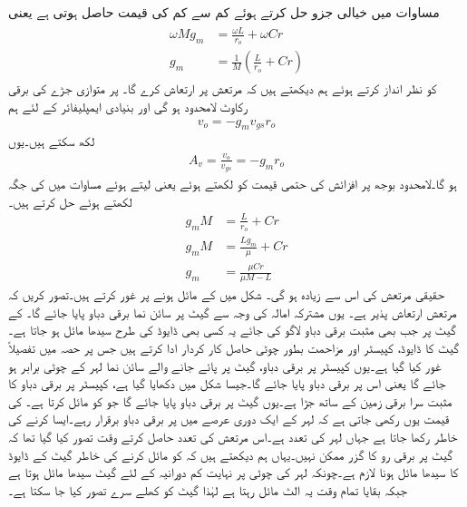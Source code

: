 مساوات  میں خیالی جزو حل کرتے ہوئے کم سے کم  کی قیمت حاصل ہوتی ہے یعنی
\begin{gather}
\begin{aligned}\label{مساوات_مرتعش_ہمسر_حقیقی_اجزاء}
\omega M g_m &= \frac{\omega L}{r_o}+\omega C r\\
g_m&=\frac{1}{M} \left(\frac{L}{r_o}+Cr \right )
\end{aligned}
\end{gather}
 کو نظر انداز کرتے ہوئے ہم دیکھتے ہیں کہ مرتعش  پر ارتعاش کرے گا۔ پر متوازی جڑے  کی برقی رکاوٹ لامحدود ہو گی اور بنیادی ایمپلیفائر کے لئے ہم
\begin{align*}
v_o=-g_m v_{gs} r_o
\end{align*}
لکھ سکتے ہیں۔یوں 
\begin{align*}
A_v=\frac{v_o}{v_{gs}}=-g_m r_o
\end{align*}
ہو گا۔لامحدود بوجھ پر افزائش کی حتمی قیمت کو  لکھتے ہوئے یعنی  لیتے ہوئے مساوات  میں  کی جگہ  لکھتے ہوئے حل کرتے ہیں۔
\begin{align*}
g_m M&= \frac{L}{r_o}+Cr \\
g_m M&=\frac{L g_m}{\mu}+Cr\\
g_m&=\frac{\mu C r}{\mu M-L}
\end{align*}
حقیقی مرتعش کی  اس سے زیادہ ہو گی۔
%
شکل  میں  کے مائل ہونے پر غور کرتے ہیں۔تصور کریں کہ  مرتعش ارتعاش پذیر ہے۔ یوں مشترکہ امالہ کی وجہ سے  گیٹ پر سائن نما برقی دباو  پایا جائے گا۔ کے گیٹ پر جب بھی مثبت برقی دباو لاگو کی جائے یہ کسی بھی ڈایوڈ کی طرح سیدھا مائل ہو جاتا ہے۔گیٹ کا ڈایوڈ، کپیسٹر  اور مزاحمت  بطور چوٹی حاصل کار کردار ادا کرتے ہیں جس پر حصہ  میں تفصیلاً غور کیا گیا ہے۔یوں کپیسٹر  پر برقی دباو، گیٹ پر پائے جانے والے سائن نما لہر کے چوٹی برابر ہو جائے گا یعنی اس پر  برقی دباو پایا جائے گا۔جیسا شکل میں دکھایا گیا ہے، کپیسٹر پر برقی دباو کا مثبت سرا برقی زمین کے ساتھ جڑا ہے۔یوں گیٹ پر  برقی دباو پایا جائے گا جو  کو مائل کرتا ہے۔ کی قیمت یوں رکھی جاتی ہے کہ  لہر کے ایک دوری عرصے میں  پر برقی دباو برقرار رہے۔ایسا کرنے کی خاطر   رکھا جاتا ہے جہاں  لہر کی تعدد ہے۔اس مرتعش کی تعدد حاصل کرتے وقت تصور کیا گیا تھا کہ گیٹ پر برقی رو کا گزر ممکن نہیں۔یہاں ہم دیکھتے ہیں کہ  کو مائل کرنے کی خاطر گیٹ کے ڈایوڈ کا سیدھا مائل ہونا لازم ہے۔چونکہ لہر کی چوٹی پر نہایت کم دورانیہ کے لئے گیٹ سیدھا مائل ہوتا ہے جبکہ بقایا تمام وقت یہ الٹ مائل رہتا ہے لہٰذا گیٹ کو کھلے سرے تصور کیا جا سکتا ہے۔

